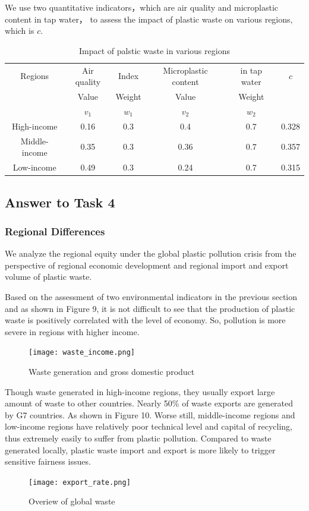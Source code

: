 \documentclass{mcmthesis}
\begin{document}
   We use two quantitative indicators，which are air quality and microplastic content in tap water， to assess the impact of plastic waste on various regions, which is $c$.
   \begin{table}[H]
	\centering  
	\renewcommand\arraystretch{1.2}     
	\caption{Impact of palstic waste in various regions}
	\begin{tabular}{|c|cc|cc|c|}%
		\hline
	   Regions&Air quality&Index&Microplastic  content &in tap water&$c$\\
	   \cline{2-5}
	   &Value&Weight&Value&Weight&\\
	   &$v_1$&$w_1$&$v_2$&$w_2$&\\
	   \hline
	   High-income&0.16&0.3&0.4&0.7&0.328\\
	   \hline
	   Middle-income&0.35&0.3&0.36&0.7&0.357\\
	   \hline
	   Low-income&0.49&0.3&0.24&0.7&0.315\\
	  \hline
	  \end{tabular}
	  \end{table}
	  
       
\subsection{Answer to Task 4}
 \subsubsection{Regional Differences}
   We analyze the regional equity under the global plastic pollution crisis from the perspective of regional economic development and regional import and export volume of plastic waste.

   Based on the assessment of two environmental indicators in the previous section and as shown in Figure 9, it is not difficult to see that the production of plastic waste is positively correlated with the level of economy. So, pollution is more severe in regions with higher income.
   \begin{figure}[H]
    \centering
     \texttt{[image: waste\_income.png]}
	\caption{Waste generation and gross domestic product}
   \end{figure}%
   Though waste generated in high-income regions, they usually export large amount of waste to other countries. Nearly 50\% of waste exports are generated by G7 countries. %
   As shown in Figure 10. Worse still, middle-income regions and low-income regions have relatively poor technical level and capital of recycling, thus extremely easily to suffer from plastic pollution. Compared to waste generated locally, plastic waste import and export is more likely to trigger sensitive fairness issues.
   \begin{figure}[H]
    \centering
     \texttt{[image: export\_rate.png]}
	\caption{Overiew of global waste}
   \end{figure}
\end{document}
